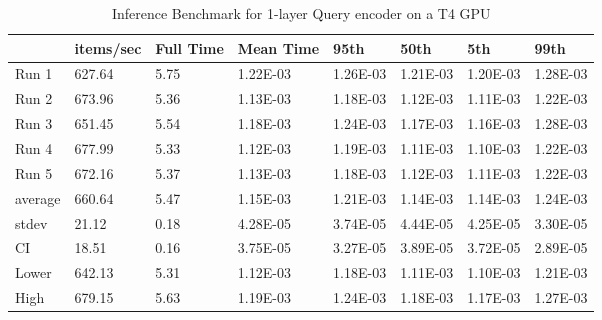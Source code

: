 \begin{table*}[!ht]
    \centering
    \begin{tabular}{|l|l|l|l|l|l|l|l|}
    \hline
        ~ & items/sec & Full Time & Mean Time & 95th & 50th & 5th & 99th \\ \hline
        Run 1 & 627.64 & 5.75 & 1.22E-03 & 1.26E-03 & 1.21E-03 & 1.20E-03 & 1.28E-03 \\ \hline
        Run 2 & 673.96 & 5.36 & 1.13E-03 & 1.18E-03 & 1.12E-03 & 1.11E-03 & 1.22E-03 \\ \hline
        Run 3 & 651.45 & 5.54 & 1.18E-03 & 1.24E-03 & 1.17E-03 & 1.16E-03 & 1.28E-03 \\ \hline
        Run 4 & 677.99 & 5.33 & 1.12E-03 & 1.19E-03 & 1.11E-03 & 1.10E-03 & 1.22E-03 \\ \hline
        Run 5 & 672.16 & 5.37 & 1.13E-03 & 1.18E-03 & 1.12E-03 & 1.11E-03 & 1.22E-03 \\ \hline
        average & 660.64 & 5.47 & 1.15E-03 & 1.21E-03 & 1.14E-03 & 1.14E-03 & 1.24E-03 \\ \hline
        stdev & 21.12 & 0.18 & 4.28E-05 & 3.74E-05 & 4.44E-05 & 4.25E-05 & 3.30E-05 \\ \hline
        CI & 18.51 & 0.16 & 3.75E-05 & 3.27E-05 & 3.89E-05 & 3.72E-05 & 2.89E-05 \\ \hline
        Lower & 642.13 & 5.31 & 1.12E-03 & 1.18E-03 & 1.11E-03 & 1.10E-03 & 1.21E-03 \\ \hline
        High & 679.15 & 5.63 & 1.19E-03 & 1.24E-03 & 1.18E-03 & 1.17E-03 & 1.27E-03 \\ \hline
    \end{tabular}
    \caption{Inference Benchmark for 1-layer Query encoder on a T4 GPU}
    \label{tab:benchmark-gpu-1layer}
\end{table*}